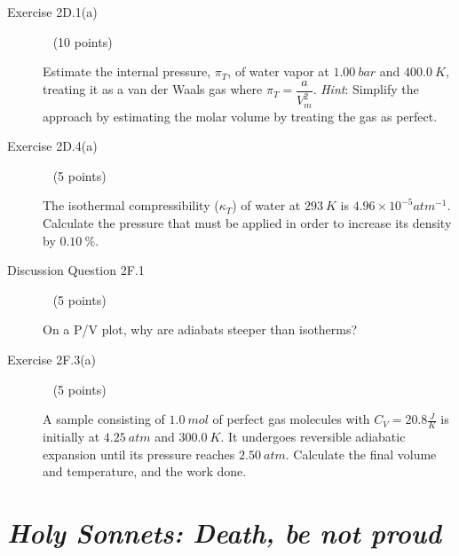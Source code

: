 \documentclass[12pt, openany, letterpaper]{memoir}
\begin{document}
\begin{description}
	\vspace{20em}
	\item [Exercise 2D.1(a)] ~ (10 points)
	
	Estimate the internal pressure, $\pi_T$, of water vapor at $1.00~bar$ and $400.0~K$, treating it as a van der Waals gas where $\pi_T=\dfrac{a}{V_m^2}$. \emph{Hint}: Simplify the approach by estimating the molar volume by treating the gas as perfect.
	
	\vspace{20em}
	\item [Exercise 2D.4(a)] ~ (5 points)
	
	The isothermal compressibility ($\kappa_T$) of water at $293~K$ is $4.96\times10^{-5}atm^{-1}$. Calculate the pressure that must be applied in order to increase its density by $0.10~\%$.
	
	\vspace{12em}
	\item [Discussion Question 2F.1] ~ (5 points)
	
	On a P/V plot, why are adiabats steeper than isotherms?
	
	\vspace{10em}
	\item [Exercise 2F.3(a)] ~ (5 points)
	
	A sample consisting of $1.0~mol$ of perfect gas molecules with $C_V=20.8\frac{J}{K}$ is initially at $4.25~atm$ and $300.0~K$. It undergoes reversible adiabatic expansion until its pressure reaches $2.50~atm$. Calculate the final volume and temperature, and the work done.
\end{description}

\newpage
\pagestyle{empty}
\addtocounter{page}{-1}
\section*{\emph{Holy Sonnets: Death, be not proud}}
\end{document}
